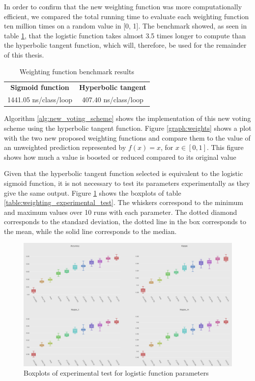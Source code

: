 In order to confirm that the new weighting function was more computationally efficient, we compared the total running time to evaluate each weighting function ten million times on a random value in [0, 1]. The benchmark showed, as seen in table \ref{table:weight_benchmark}, that the logistic function takes almost 3.5 times longer to compute than the hyperbolic tangent function, which will, therefore, be used for the remainder of this thesis.

\begin{table}[]
\centering
\caption{\label{table:weight_benchmark}Weighting function benchmark results}
\begin{tabular}{|c|c|}
\hline
\textbf{Sigmoid function} & \textbf{Hyperbolic tangent} \\ \hhline{==}
1441.05 ns/class/loop & 407.40 ns/class/loop \\ \hline
\end{tabular}
\end{table}

Algorithm \ref{alg:new_voting_scheme} shows the implementation of this new voting scheme using the hyperbolic tangent function. Figure \ref{graph:weights} shows a plot with the two new proposed weighting functions and compare them to the value of an unweighted prediction represented by $f(x) =x$, for  $x \in [0,1]$. This figure shows how much a value is boosted or reduced compared to its original value

Given that the hyperbolic tangent function selected is equivalent to the logistic sigmoid function, it is not necessary to test its parameters experimentally as they give the same output. Figure \ref{fig:boxplots_params} shows the boxplots of table \ref{table:weighting_experimental_test}. The whiskers correspond to the minimum and maximum values over 10 runs with each parameter. The dotted diamond corresponds to the standard deviation, the dotted line in the box corresponds to the mean, while the solid line corresponds to the median.

\begin{figure}
  \includegraphics[width=\linewidth]{./images/chapter3/boxplots_params}
\caption{\label{fig:boxplots_params}Boxplots of experimental test for logistic function parameters}
\end{figure}



